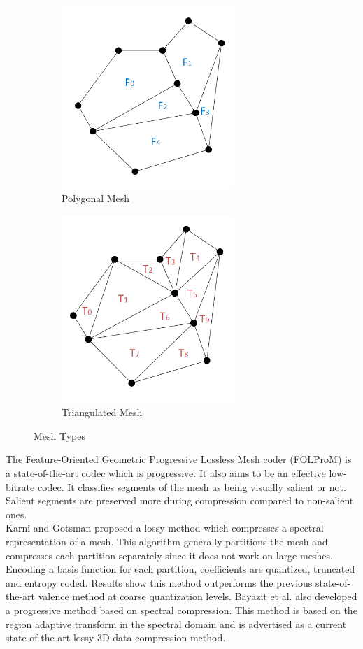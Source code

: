 \begin{figure}[t!] 
	\centering
	\begin{subfigure}[b]{6.8cm}
		\includegraphics[width=6.5cm]{images/ch2/PolygonMeshExample}
		\caption{Polygonal Mesh}
		\label{fig:MeshExamples_polygon}
	\end{subfigure}%
	\begin{subfigure}[b]{6.8cm}
		\includegraphics[width=6.5cm]{images/ch2/TriangleMeshExample}
		\caption{Triangulated Mesh}
		\label{fig:MeshExamples_triangle}
	\end{subfigure}%
	\caption{Mesh Types}
	\label{MeshExamples}
\end{figure}


The Feature-Oriented Geometric Progressive Lossless Mesh coder (FOLProM) \cite{Peng10Feature} is a state-of-the-art codec which is progressive. It also aims to be an effective low-bitrate codec. It classifies segments of the mesh as being visually salient or not. Salient segments are preserved more during compression compared to non-salient ones. \\

Karni and Gotsman \cite{Karni00Spectral} proposed a lossy method which compresses a spectral representation of a mesh. This algorithm generally partitions the mesh and compresses each partition separately since it does not work on large meshes. Encoding a basis function for each partition, coefficients are quantized, truncated and entropy coded. Results show this method outperforms the previous state-of-the-art valence method \cite{touma98triangle} at coarse quantization levels. Bayazit et al. \cite{Bayazit103DMesh} also developed a progressive method based on spectral compression. This method is based on the region adaptive transform in the spectral domain and is advertised as a current state-of-the-art lossy 3D data compression method. \\

